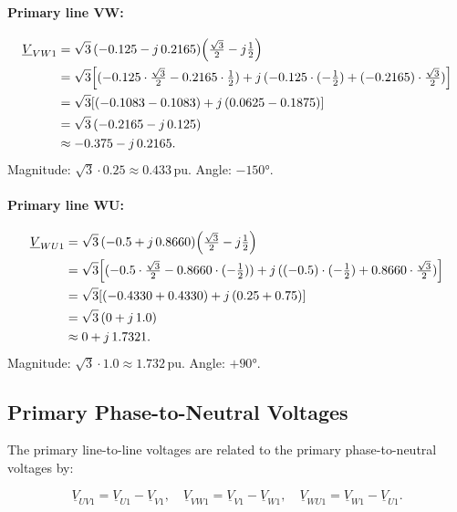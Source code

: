 \documentclass[a4paper,11pt]{article}
\begin{document}
\paragraph{Primary line VW:}
\begin{align}
\underline{V}_{VW1}
  &= \sqrt{3}\,(-0.125-j\,0.2165)\!\left(\tfrac{\sqrt{3}}{2}-j\tfrac{1}{2}\right)\notag\\
  &= \sqrt{3}\!\left[(-0.125\cdot\tfrac{\sqrt{3}}{2}-0.2165\cdot\tfrac{1}{2})
     +j\,(-0.125\cdot(-\tfrac{1}{2})+(-0.2165)\cdot\tfrac{\sqrt{3}}{2})\right]\notag\\
  &= \sqrt{3}\!\left[(-0.1083-0.1083)+j\,(0.0625-0.1875)\right]\notag\\
  &= \sqrt{3}\,(-0.2165-j\,0.125)\notag\\
  &\approx -0.375 - j\,0.2165.
\end{align}
Magnitude: $\sqrt{3}\cdot 0.25 \approx 0.433\,\mathrm{pu}$. \quad
Angle: $-150°$.

\paragraph{Primary line WU:}
\begin{align}
\underline{V}_{WU1}
  &= \sqrt{3}\,(-0.5+j\,0.8660)\!\left(\tfrac{\sqrt{3}}{2}-j\tfrac{1}{2}\right)\notag\\
  &= \sqrt{3}\!\left[(-0.5\cdot\tfrac{\sqrt{3}}{2}-0.8660\cdot(-\tfrac{1}{2}))
     +j\,((-0.5)\cdot(-\tfrac{1}{2})+0.8660\cdot\tfrac{\sqrt{3}}{2})\right]\notag\\
  &= \sqrt{3}\!\left[(-0.4330+0.4330)+j\,(0.25+0.75)\right]\notag\\
  &= \sqrt{3}\,(0+j\,1.0)\notag\\
  &\approx 0 + j\,1.7321.
\end{align}
Magnitude: $\sqrt{3}\cdot 1.0 \approx 1.732\,\mathrm{pu}$. \quad
Angle: $+90°$.

\subsection{Primary Phase-to-Neutral Voltages}

The primary line-to-line voltages are related to the primary
phase-to-neutral voltages by:

\begin{equation}
\underline{V}_{UV1} = \underline{V}_{U1} - \underline{V}_{V1},\quad
\underline{V}_{VW1} = \underline{V}_{V1} - \underline{V}_{W1},\quad
\underline{V}_{WU1} = \underline{V}_{W1} - \underline{V}_{U1}.
\end{equation}
\end{document}
